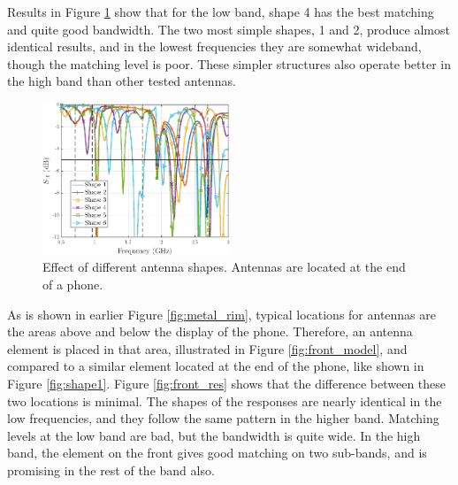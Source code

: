 Results in Figure \ref{fig:shape} show that for the low band, shape 4 has the best matching and quite good bandwidth. The two most simple shapes, 1 and 2, produce almost identical results, and in the lowest frequencies they are somewhat wideband, though the matching level is poor. These simpler structures also operate better in the high band than other tested antennas.

\begin{figure}[H]
    \centering
    \includegraphics[width=0.5\textwidth]{img/shape.eps}
    \caption{Effect of different antenna shapes. Antennas are located at the end of a phone.}
    \label{fig:shape}
\end{figure}

As is shown in earlier Figure \ref{fig:metal_rim}, typical locations for antennas are the areas above and below the display of the phone. Therefore, an antenna element is placed in that area, illustrated in Figure \ref{fig:front_model}, and compared to a similar element located at the end of the phone, like shown in Figure \ref{fig:shape1}. Figure \ref{fig:front_res} shows that the difference between these two locations is minimal. The shapes of the responses are nearly identical in the low frequencies, and they follow the same pattern in the higher band. Matching levels at the low band are bad, but the bandwidth is quite wide. In the high band, the element on the front gives good matching on two sub-bands, and is promising in the rest of the band also.

